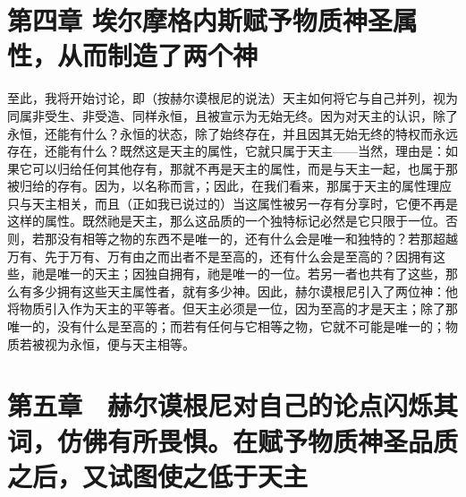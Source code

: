 \section{第四章 埃尔摩格内斯赋予物质神圣属性，从而制造了两个神}

至此，我将开始讨论，即（按赫尔谟根尼的说法）天主如何将它与自己并列，视为同属非受生、非受造、同样永恒，且被宣示为无始无终。因为对天主的认识，除了永恒，还能有什么？永恒的状态，除了始终存在，并且因其无始无终的特权而永远存在，还能有什么？既然这是天主的属性，它就只属于天主——当然，理由是：如果它可以归给任何其他存有，那就不再是天主的属性，而是与天主一起，也属于那被归给的存有。因为，以名称而言，；因此，在我们看来，那属于天主的属性理应只与天主相关，而且（正如我已说过的）当这属性被另一存有分享时，它便不再是这样的属性。既然祂是天主，那么这品质的一个独特标记必然是它只限于一位。否则，若那没有相等之物的东西不是唯一的，还有什么会是唯一和独特的？若那超越万有、先于万有、万有由之而出者不是至高的，还有什么会是至高的？因拥有这些，祂是唯一的天主；因独自拥有，祂是唯一的一位。若另一者也共有了这些，那么有多少拥有这些天主属性者，就有多少神。因此，赫尔谟根尼引入了两位神：他将物质引入作为天主的平等者。但天主必须是一位，因为至高的才是天主；除了那唯一的，没有什么是至高的；而若有任何与它相等之物，它就不可能是唯一的；物质若被视为永恒，便与天主相等。\par


\section{第五章　赫尔谟根尼对自己的论点闪烁其词，仿佛有所畏惧。在赋予物质神圣品质之后，又试图使之低于天主}

